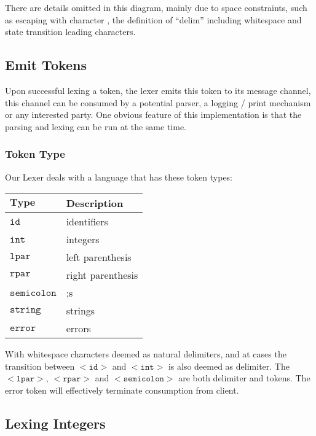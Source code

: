 \documentclass[%
 aip,
 jmp,%
 amsmath,amssymb,
 reprint,%
]{revtex4-1}
\begin{document}
There are details omitted in this diagram, mainly due to space constraints, such
as escaping with character {\large \texttildelow}, the definition of ``delim'' including
whitespace and state transition leading characters.

\subsection{Emit Tokens}

Upon successful lexing a token, the lexer emits this token to its message
channel, this channel can be consumed by a potential parser, a logging / print
mechanism or any interested party. One obvious feature of this implementation
is that the parsing and lexing can be run at the same time.

\subsubsection{Token Type}
Our Lexer deals with a language that has these token types:

\begin{table}[h]
\centering
\begin{tabular}{l|l}
$\mathbf{Type}$& Description \\
\hline
$\mathtt{id}$& identifiers \\
$\mathtt{int}$& integers \\
$\mathtt{lpar}$& left parenthesis \\
$\mathtt{rpar}$& right parenthesis \\
$\mathtt{semicolon}$& ;s \\
$\mathtt{string}$& strings \\
$\mathtt{error}$& errors
\end{tabular}
\end{table}

With whitespace characters deemed as natural delimiters, and at cases the
transition between $\mathtt{<id>}$ and $\mathtt{<int>}$ is also deemed as delimiter. The $\mathtt{<lpar>}$,
$\mathtt{<rpar>}$ and $\mathtt{<semicolon>}$ are both delimiter and tokens.
The error token will effectively terminate consumption from client.

\subsection{Lexing Integers}
\end{document}

